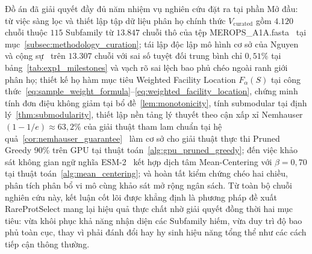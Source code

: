 Đồ án đã giải quyết đầy đủ năm nhiệm vụ nghiên cứu đặt ra tại phần Mở đầu: từ việc sàng lọc và thiết lập tập dữ liệu phân họ chính thức $V_{\text{curated}}$ gồm $4.120$ chuỗi thuộc $115$ Subfamily từ $13.847$ chuỗi thô của tệp MEROPS\_A1A.fasta~\cite{merops} tại mục~\ref{subsec:methodology_curation}; tái lập độc lập mô hình cơ sở của Nguyen và cộng sự~\cite{nguyen2025} trên $13.307$ chuỗi với sai số tuyệt đối trung bình chỉ $0{,}51\%$ tại bảng~\ref{tab:exp1_milestones} và vạch rõ sai lệch bao phủ chéo ngoài ranh giới phân họ; thiết kế họ hàm mục tiêu Weighted Facility Location $F_\alpha(S)$ tại công thức~\eqref{eq:sample_weight_formula}--\eqref{eq:weighted_facility_location}, chứng minh tính đơn điệu không giảm tại bổ đề~\ref{lem:monotonicity}, tính submodular tại định lý~\ref{thm:submodularity}, thiết lập nền tảng lý thuyết theo cận xấp xỉ Nemhauser $(1 - 1/e) \approx 63{,}2\%$ của giải thuật tham lam chuẩn tại hệ quả~\ref{cor:nemhauser_guarantee}~\cite{nemhauser1978} làm cơ sở cho giải thuật thực thi Pruned Greedy 90\% trên GPU tại thuật toán~\ref{alg:gpu_pruned_greedy}; đến việc khảo sát không gian ngữ nghĩa ESM-2~\cite{esm2} kết hợp dịch tâm Mean-Centering với $\beta = 0{,}70$ tại thuật toán~\ref{alg:mean_centering}; và hoàn tất kiểm chứng chéo hai chiều, phân tích phân bổ vi mô cùng khảo sát mở rộng ngân sách. Từ toàn bộ chuỗi nghiên cứu này, kết luận cốt lõi được khẳng định là phương pháp đề xuất RareProtSelect mang lại hiệu quả thực chất nhờ giải quyết đồng thời hai mục tiêu: vừa khôi phục khả năng nhận diện các Subfamily hiếm, vừa duy trì độ bao phủ toàn cục, thay vì phải đánh đổi hay hy sinh hiệu năng tổng thể như các cách tiếp cận thông thường.

